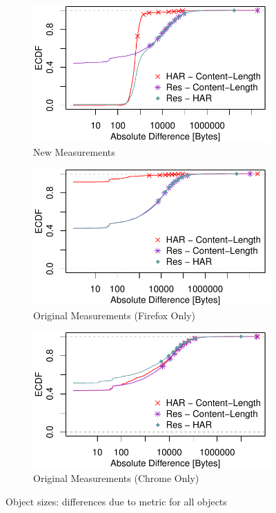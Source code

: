 \begin{figure}
		\centering
\begin{subfigure}{\linewidth}
		\includegraphics[width=\linewidth]{New_Plots/ecdf_diff_objectsizes.pdf}
	\caption{New Measurements}
	\label{fig:new_absolute_byte_index}
\end{subfigure}\par\medskip
 \begin{subfigure}{\linewidth}
		\centering
		\includegraphics[width=\linewidth]{Firefox Plots/ecdf_diff_objectsizes.pdf}
	\caption{Original Measurements (Firefox Only)}
	\label{fig:orig_absolute_byte_index}
\end{subfigure}
 \begin{subfigure}{\linewidth}
		\includegraphics[width=\linewidth]{Chrome_Plots/ecdf_diff_objectsizes.pdf}
	\caption{Original Measurements (Chrome Only)}
	\label{fig:orig_chrome_absolute_byte_index}
\end{subfigure}
\caption{Object sizes: differences due to metric for all objects}
	\label{fig:absolute_byte_index}
\end{figure}


